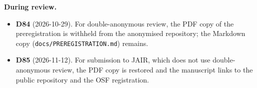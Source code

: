 \noindent\textbf{During review.}
\begin{itemize}
\item \textbf{D84} (2026-10-29). For double-anonymous review, the PDF copy of the preregistration is withheld from the anonymised repository; the Markdown copy (\texttt{docs/PREREGISTRATION.md}) remains.
\item \textbf{D85} (2026-11-12). For submission to JAIR, which does not use double-anonymous review, the PDF copy is restored and the manuscript links to the public repository and the OSF registration.
\end{itemize}
